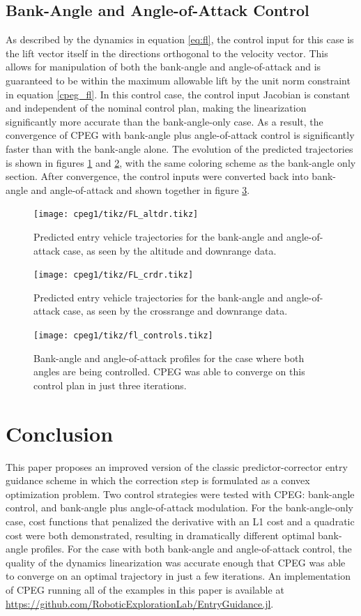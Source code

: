 \subsection{Bank-Angle and Angle-of-Attack Control}
As described by the dynamics in equation \eqref{eq:fl}, the control input for this case is the lift vector itself in the directions orthogonal to the velocity vector. This allows for manipulation of both the bank-angle and angle-of-attack and is guaranteed to be within the maximum allowable lift by the unit norm constraint in equation \eqref{cpeg_fl}. In this control case, the control input Jacobian is constant and independent of the nominal control plan, making the linearization significantly more accurate than the bank-angle-only case. As a result, the convergence of CPEG with bank-angle plus angle-of-attack control is significantly faster than with the bank-angle alone. The evolution of the predicted trajectories is shown in figures \ref{fig:flalt} and \ref{fig:flcrdr}, with the same coloring scheme as the bank-angle only section. After convergence, the control inputs were converted back into bank-angle and angle-of-attack and shown together in figure \ref{fig:flcontrols}.
\begin{figure}
    \centering
    \texttt{[image: cpeg1/tikz/FL\_altdr.tikz]}
    \caption{Predicted entry vehicle trajectories for the bank-angle and angle-of-attack case, as seen by the altitude and downrange data.}
    \label{fig:flalt}
\end{figure}
\begin{figure}
    \centering
    \texttt{[image: cpeg1/tikz/FL\_crdr.tikz]}
    \caption{Predicted entry vehicle trajectories for the bank-angle and angle-of-attack case, as seen by the crossrange and downrange data.}
    \label{fig:flcrdr}
\end{figure}
\begin{figure}
    \centering
    \texttt{[image: cpeg1/tikz/fl\_controls.tikz]}
    \caption{Bank-angle and angle-of-attack profiles for the case where both angles are being controlled. CPEG was able to converge on this control plan in just three iterations.}
    \label{fig:flcontrols}
\end{figure}
\section{Conclusion}
\label{sec:cpeg1:conclusion}
This paper proposes an improved version of the classic predictor-corrector entry guidance scheme in which the correction step is formulated as a convex optimization problem. Two control strategies were tested with CPEG: bank-angle control, and bank-angle plus angle-of-attack modulation. For the bank-angle-only case, cost functions that penalized the derivative with an L1 cost and a quadratic cost were both demonstrated, resulting in dramatically different optimal bank-angle profiles. For the case with both bank-angle and angle-of-attack control, the quality of the dynamics linearization was accurate enough that CPEG was able to converge on an optimal trajectory in just a few iterations. An implementation of CPEG running all of the examples in this paper is available at \url{https://github.com/RoboticExplorationLab/EntryGuidance.jl}.


